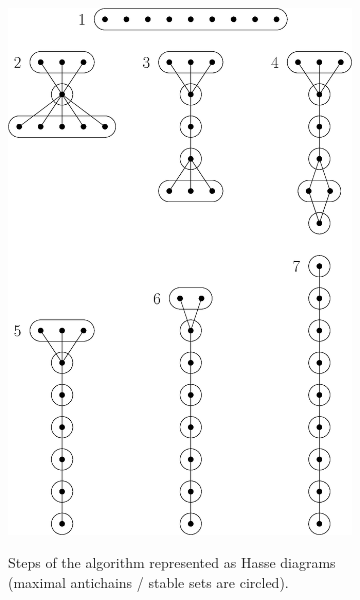 \begin{figure} \centering \begin{subfigure}[t]{0.4\textwidth}
{\includegraphics[width=\textwidth]{fig/supi/quicksort}} \caption{Steps of the
\quicksort algorithm represented as Hasse diagrams (maximal antichains / stable
sets are circled).} \label{fig:supi:quicksort} \end{subfigure}
~
\begin{subfigure}[t]{0.4\textwidth}

\end{subfigure}
\end{figure}
